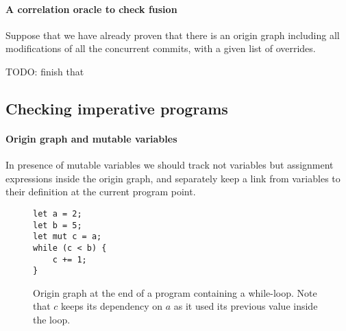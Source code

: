 \documentclass[a4paper,10pt]{article}
\begin{document}
\paragraph{A correlation oracle to check fusion} Suppose that we have already proven that there is an origin graph including all modifications of all the concurrent commits, with a given list of overrides.

TODO: finish that

\subsection{Checking imperative programs}

\paragraph{Origin graph and mutable variables} In presence of mutable variables we should track not variables but assignment expressions inside the origin graph, and separately keep a link from variables to their definition at the current program point.

\begin{figure}[ht]
\begin{minipage}{.5\textwidth}
\begin{lstlisting}
let a = 2;
let b = 5;
let mut c = a;
while (c < b) {
    c += 1;
}
\end{lstlisting}
\end{minipage}\hfill
\begin{minipage}{.45\textwidth}
\centering{}
\end{minipage}
\caption{Origin graph at the end of a program containing a while-loop. Note that $c$ keeps its dependency on $a$ as it used its previous value inside the loop.}
\end{figure}
\end{document}
